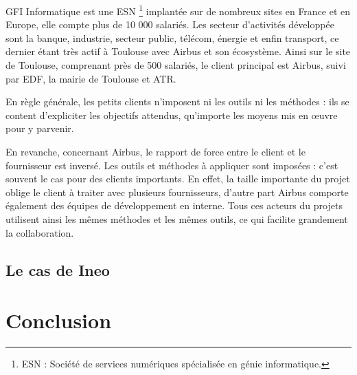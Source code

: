 GFI Informatique est une \gls{ESN} \footnote{ESN : Société de services numériques spécialisée en génie informatique.} implantée sur de nombreux sites en France et en Europe, elle compte plus de 10 000 salariés. Les secteur d'activités développée sont la banque, industrie, secteur public, télécom, énergie et enfin transport, ce dernier étant très actif à Toulouse avec Airbus et son écosystème. Ainsi sur le site de Toulouse, comprenant près de 500 salariés, le client principal est Airbus, suivi par EDF, la mairie de Toulouse et ATR.

En règle générale, les petits clients n'imposent ni les outils ni les méthodes : ils se content d'expliciter les objectifs attendus, qu'importe les moyens mis en œuvre pour y parvenir.

En revanche, concernant Airbus, le rapport de force entre le client et le fournisseur est inversé. Les outils et méthodes à appliquer sont imposées : c'est souvent le cas pour des clients importants. En effet, la taille importante du projet oblige le client à traiter avec plusieurs fournisseurs, d'autre part Airbus comporte également des équipes de développement en interne. Tous ces acteurs du projets utilisent ainsi les mêmes méthodes et les mêmes outils, ce qui facilite grandement la collaboration.

\subsection{Le cas de Ineo}



\section{Conclusion}
